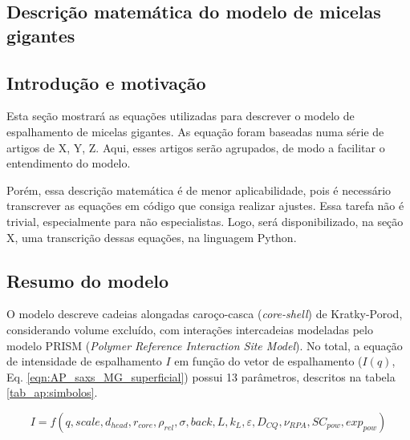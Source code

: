 \begin{apendicesenv}
\partapendices

\chapter{Descrição matemática do modelo de micelas gigantes}
\label{sec:modelo_MG_matematica}
\section{Introdução e motivação}

Esta seção mostrará as equações utilizadas para descrever o modelo de espalhamento de micelas gigantes. As equação foram baseadas numa série de artigos de X, Y, Z. Aqui, esses artigos serão agrupados, de modo a facilitar o entendimento do modelo.

Porém, essa descrição matemática é de menor aplicabilidade, pois é necessário transcrever as equações em código que consiga realizar ajustes. Essa tarefa não é trivial, especialmente para não especialistas. Logo, será disponibilizado, na seção X, uma transcrição dessas equações, na linguagem Python.


\section{Resumo do modelo}

O modelo descreve cadeias alongadas caroço-casca (\emph{core-shell}) de Kratky-Porod, considerando volume excluído, com interações intercadeias modeladas pelo modelo PRISM (\emph{Polymer Reference Interaction Site Model}). No total, a equação de intensidade de espalhamento \(I\) em função do vetor de espalhamento \q (\(I(q)\), Eq. \ref{eqn:AP_saxs_MG_superficial}) possui 13 parâmetros, descritos na tabela \ref{tab_ap:simbolos}.

\begin{equation}
I = f(q, scale, d_{head}, r_{core}, \rho_{rel}, \sigma, back, L, k_L, \varepsilon, D_{CQ}, \nu_{RPA}, SC_{pow}, exp_{pow})
\label{eqn:AP_saxs_MG_superficial}
\end{equation}


\end{apendicesenv}
